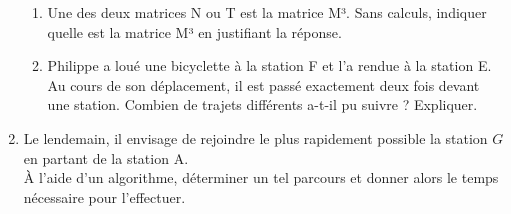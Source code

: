 \begin{enumerate}
\begin{center}
\end{center}
     \begin{enumerate}[label=\alph*.]
          \item
          Une des deux matrices N ou T est la matrice M³. Sans calculs, indiquer quelle est la matrice M³ en justifiant la réponse.
          \item
          Philippe a loué une bicyclette à la station F et l'a rendue à la station E. Au cours de son déplacement, il est passé exactement deux fois devant une station. Combien de trajets différents a-t-il pu suivre ? Expliquer.
     \end{enumerate}
     \item
     Le lendemain, il envisage de rejoindre le plus rapidement possible la station $G$ en partant de la station A. 
\\
À l'aide d'un algorithme, déterminer un tel parcours et donner alors le temps nécessaire pour l'effectuer.
\end{enumerate}

